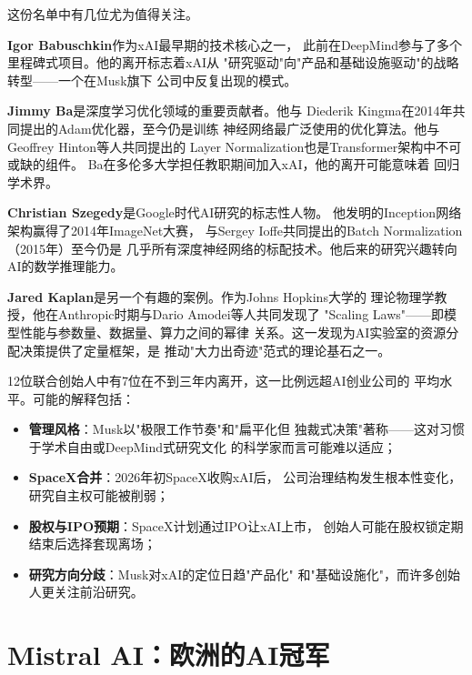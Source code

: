 这份名单中有几位尤为值得关注。

\textbf{Igor Babuschkin}作为xAI最早期的技术核心之一，
此前在DeepMind参与了多个里程碑式项目。他的离开标志着xAI从
"研究驱动"向"产品和基础设施驱动"的战略转型——一个在Musk旗下
公司中反复出现的模式。

\textbf{Jimmy Ba}是深度学习优化领域的重要贡献者。他与
Diederik Kingma在2014年共同提出的Adam优化器，至今仍是训练
神经网络最广泛使用的优化算法。他与Geoffrey Hinton等人共同提出的
Layer Normalization也是Transformer架构中不可或缺的组件。
Ba在多伦多大学担任教职期间加入xAI，他的离开可能意味着
回归学术界。

\textbf{Christian Szegedy}是Google时代AI研究的标志性人物。
他发明的Inception网络架构赢得了2014年ImageNet大赛，
与Sergey Ioffe共同提出的Batch Normalization（2015年）至今仍是
几乎所有深度神经网络的标配技术。他后来的研究兴趣转向
AI的数学推理能力。

\textbf{Jared Kaplan}是另一个有趣的案例。作为Johns Hopkins大学的
理论物理学教授，他在Anthropic时期与Dario Amodei等人共同发现了
"Scaling Laws"——即模型性能与参数量、数据量、算力之间的幂律
关系。这一发现为AI实验室的资源分配决策提供了定量框架，是
推动"大力出奇迹"范式的理论基石之一。

\begin{whybox}[xAI创始人出走潮说明了什么？]
12位联合创始人中有7位在不到三年内离开，这一比例远超AI创业公司的
平均水平。可能的解释包括：
\begin{itemize}
  \item \textbf{管理风格}：Musk以"极限工作节奏"和"扁平化但
    独裁式决策"著称——这对习惯于学术自由或DeepMind式研究文化
    的科学家而言可能难以适应；
  \item \textbf{SpaceX合并}：2026年初SpaceX收购xAI后，
    公司治理结构发生根本性变化，研究自主权可能被削弱；
  \item \textbf{股权与IPO预期}：SpaceX计划通过IPO让xAI上市，
    创始人可能在股权锁定期结束后选择套现离场；
  \item \textbf{研究方向分歧}：Musk对xAI的定位日趋"产品化"
    和"基础设施化"，而许多创始人更关注前沿研究。
\end{itemize}
\end{whybox}


\section{Mistral AI：欧洲的AI冠军}
\label{sec:mistral}

